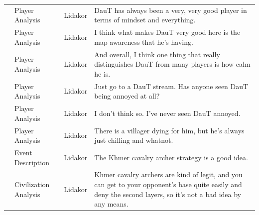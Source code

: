 {\begin{longtable}{@{}>{\theAppRow}r|L{2.3cm}L{1.0cm}U{11.55cm}@{}}
    & Player Analysis       & Lidakor & DauT has always been a very, very good player in terms of mindset and everything.                                                                                                                                                                                                               \\
    & Player Analysis       & Lidakor & I think what makes DauT very good here is the map awareness that he's having.                                                                                                                                                                                                                   \\
    & Player Analysis       & Lidakor & And overall, I think one thing that really distinguishes DauT from many players is how calm he is.                                                                                                                                                                                              \\
    & Player Analysis       & Lidakor & Just go to a DauT stream. Has anyone seen DauT being annoyed at all?                                                                                                                                                                                                                            \\
    & Player Analysis       & Lidakor & I don't think so. I've never seen DauT annoyed.                                                                                                                                                                                                                                                 \\
    & Player Analysis       & Lidakor & There is a villager dying for him, but he's always just chilling and whatnot.                                                                                                                                                                                                                   \\
    & Event Description     & Lidakor & The Khmer cavalry archer strategy is a good idea.                                                                                                                                                                                                                                               \\
    & Civilization Analysis & Lidakor & Khmer cavalry archers are kind of legit, and you can get to your opponent's base quite easily and deny the second layers, so it's not a bad idea by any means.                                                                                                                                  \\

\end{longtable}}

